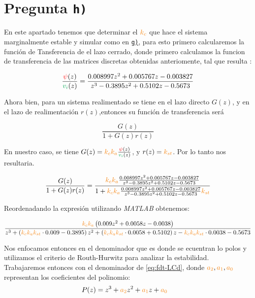 \section{Pregunta \texttt{h)}}\label{pregunta-h}


En este apartado tenemos que determinar el $\nara{k_c}$  que hace el sistema marginalmente
estable y simular como en \hyperref[pregunta-g]{\texttt{g)}}, para esto primero 
calcularemos la función de Tansferencia de el lazo cerrado, donde primero calculamos la funcion de transferencia de las matrices discretas obtenidas anteriomente, tal que resulta :

\begin{equation}
   \frac{\rojo{\psi}(z)}{\verd{v_{i}}(z)} = \frac{0.008997z^2 + 0.005767 z - 0.003827}
    {z^3 - 0.3895 z^2 + 0.5102 z -0.5673}
\end{equation}


Ahora bien, para un sistema realimentado se tiene en el lazo directo $G(z)$, y 
en el lazo de realimentación $r(z)$,entonces su función de transferencia será

\begin{equation}
    \frac{G(z)}{1 + G(z)r(z)}
\end{equation}

En nuestro caso, se tiene $G(z) = \nara{k_{c} k_{a}} \frac{\rojo{\psi}(z)}{\verd{v_i}(z)}$,
y $r(z) = \nara{k_{st}}$. Por lo tanto nos resultaria.

\begin{equation}
    \frac{G(z)}{1 + G(z)r(z)} = \dfrac{\nara{k_ck_a} \frac{0.008997z^2 + 0.005767 z - 0.003827}
    {z^3 - 0.3895 z^2 + 0.5102 z -0.5673}}
    {1+\nara{k_ck_a} \frac{0.008997z^2 + 0.005767 z - 0.003827}
    {z^3 - 0.3895 z^2 + 0.5102 z -0.5673}\nara{k_{st}}}
\end{equation}

Reordenadando la expresión utilizando \textit{MATLAB} obtenemos:

\begin{equation}\label{eq:fdt-LCd}
    \frac{ \nara{k_c k_a} \left( 0.009 z^2 + 0.0058 z - 0.0038 \right)}
    { z^3 + \left( \nara{k_c k_a k_{st}} \cdot 0.009 - 0.3895 \right) z^2 
    + \left( \nara{k_c k_a k_{st}} \cdot 0.0058 + 0.5102 \right) z 
    - \nara{k_c k_a k_{st}} \cdot 0.0038 - 0.5673 }
\end{equation}


Nos enfocamos entonces en el denominador que es donde se ecuentran lo polos y
utilizamos el criterio de Routh-Hurwitz para analizar la estabilidad. 
Trabajaremos entonces con el denominador de \eqref{eq:fdt-LCd}, donde $\nara{a_2},\nara{a_1},\nara{a_0}$
representan los coeficientes del polinomio:
\begin{align}
    P(z) =  z^3 + \nara{a_2} z^2 + \nara{a_1} z + \nara{a_0} &
\end{align}

